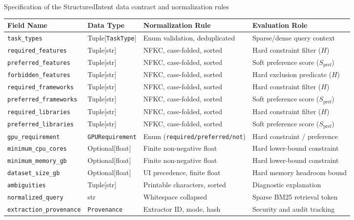 \begin{table}[ht]{Specification of the StructuredIntent data contract and normalization rules}
\label{tab:structured_intent_schema}
\centering\footnotesize
\begin{tabular}{p{3.2cm}p{2.6cm}p{3.8cm}p{3.8cm}}
\toprule
\textbf{Field Name} & \textbf{Data Type} & \textbf{Normalization Rule} & \textbf{Evaluation Role} \\
\midrule
\texttt{task\_types} & Tuple[\texttt{TaskType}] & Enum validation, deduplicated & Sparse/dense query context \\
\texttt{required\_features} & Tuple[str] & NFKC, case-folded, sorted & Hard constraint filter ($H$) \\
\texttt{preferred\_features} & Tuple[str] & NFKC, case-folded, sorted & Soft preference score ($S_{\mathrm{pref}}$) \\
\texttt{forbidden\_features} & Tuple[str] & NFKC, case-folded, sorted & Hard exclusion predicate ($H$) \\
\texttt{required\_frameworks} & Tuple[str] & NFKC, case-folded, sorted & Hard constraint filter ($H$) \\
\texttt{preferred\_frameworks}& Tuple[str] & NFKC, case-folded, sorted & Soft preference score ($S_{\mathrm{pref}}$) \\
\texttt{required\_libraries}  & Tuple[str] & NFKC, case-folded, sorted & Hard constraint filter ($H$) \\
\texttt{preferred\_libraries} & Tuple[str] & NFKC, case-folded, sorted & Soft preference score ($S_{\mathrm{pref}}$) \\
\texttt{gpu\_requirement}     & \texttt{GPURequirement} & Enum (\texttt{required/preferred/not}) & Hard constraint / preference \\
\texttt{minimum\_cpu\_cores}  & Optional[float] & Finite non-negative float & Hard lower-bound constraint \\
\texttt{minimum\_memory\_gb}  & Optional[float] & Finite non-negative float & Hard lower-bound constraint \\
\texttt{dataset\_size\_gb}    & Optional[float] & UI precedence, finite float & Hard memory headroom bound \\
\texttt{ambiguities}          & Tuple[str] & Printable characters, sorted & Diagnostic explanation \\
\texttt{normalized\_query}    & str & Whitespace collapsed & Sparse BM25 retrieval token \\
\texttt{extraction\_provenance}& \texttt{Provenance} & Extractor ID, mode, hash & Security and audit tracking \\
\bottomrule
\end{tabular}
\end{table}

